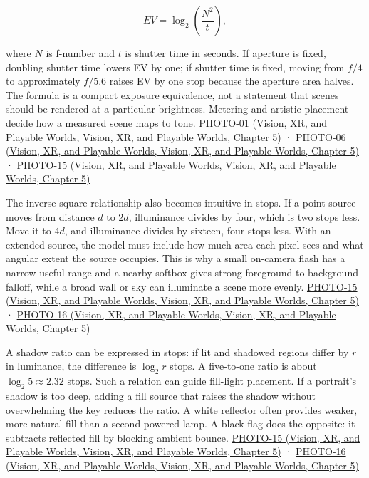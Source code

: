 \[
EV=\log_2\left(\frac{N^2}{t}\right),
\]

where \(N\) is f-number and \(t\) is shutter time in seconds. If aperture is fixed, doubling shutter time lowers EV by one; if shutter time is fixed, moving from \(f/4\) to approximately \(f/5.6\) raises EV by one stop because the aperture area halves. The formula is a compact exposure equivalence, not a statement that scenes should be rendered at a particular brightness. Metering and artistic placement decide how a measured scene maps to tone. \href{../07-Vision-XR-and-Playable-Worlds/main.pdf\#nameddest=04-visual-computing-ii-ch036-photo-01---photography-session-01}{PHOTO-01 (Vision, XR, and Playable Worlds, Vision, XR, and Playable Worlds, Chapter 5)} · \href{../07-Vision-XR-and-Playable-Worlds/main.pdf\#nameddest=04-visual-computing-ii-ch036-photo-06---photography-session-06}{PHOTO-06 (Vision, XR, and Playable Worlds, Vision, XR, and Playable Worlds, Chapter 5)} · \href{../07-Vision-XR-and-Playable-Worlds/main.pdf\#nameddest=04-visual-computing-ii-ch036-photo-15---photography-session-15}{PHOTO-15 (Vision, XR, and Playable Worlds, Vision, XR, and Playable Worlds, Chapter 5)}

The inverse-square relationship also becomes intuitive in stops. If a point source moves from distance \(d\) to \(2d\), illuminance divides by four, which is two stops less. Move it to \(4d\), and illuminance divides by sixteen, four stops less. With an extended source, the model must include how much area each pixel sees and what angular extent the source occupies. This is why a small on-camera flash has a narrow useful range and a nearby softbox gives strong foreground-to-background falloff, while a broad wall or sky can illuminate a scene more evenly. \href{../07-Vision-XR-and-Playable-Worlds/main.pdf\#nameddest=04-visual-computing-ii-ch036-photo-15---photography-session-15}{PHOTO-15 (Vision, XR, and Playable Worlds, Vision, XR, and Playable Worlds, Chapter 5)} · \href{../07-Vision-XR-and-Playable-Worlds/main.pdf\#nameddest=04-visual-computing-ii-ch036-photo-16---photography-session-16}{PHOTO-16 (Vision, XR, and Playable Worlds, Vision, XR, and Playable Worlds, Chapter 5)}

A shadow ratio can be expressed in stops: if lit and shadowed regions differ by \(r\) in luminance, the difference is \(\log_2 r\) stops. A five-to-one ratio is about \(\log_2 5\approx2.32\) stops. Such a relation can guide fill-light placement. If a portrait's shadow is too deep, adding a fill source that raises the shadow without overwhelming the key reduces the ratio. A white reflector often provides weaker, more natural fill than a second powered lamp. A black flag does the opposite: it subtracts reflected fill by blocking ambient bounce. \href{../07-Vision-XR-and-Playable-Worlds/main.pdf\#nameddest=04-visual-computing-ii-ch036-photo-15---photography-session-15}{PHOTO-15 (Vision, XR, and Playable Worlds, Vision, XR, and Playable Worlds, Chapter 5)} · \href{../07-Vision-XR-and-Playable-Worlds/main.pdf\#nameddest=04-visual-computing-ii-ch036-photo-16---photography-session-16}{PHOTO-16 (Vision, XR, and Playable Worlds, Vision, XR, and Playable Worlds, Chapter 5)}

